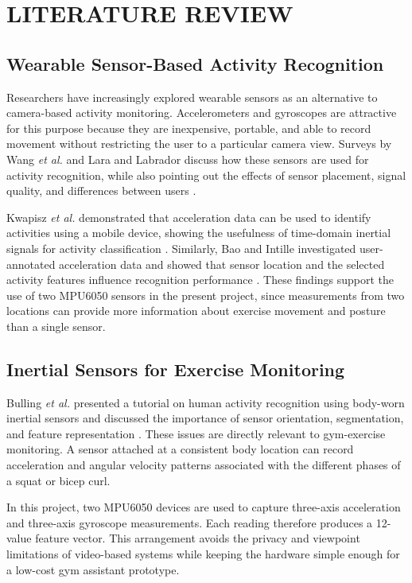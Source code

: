\chapter{LITERATURE REVIEW}

\section{Wearable Sensor-Based Activity Recognition}
Researchers have increasingly explored wearable sensors as an alternative to
camera-based activity monitoring. Accelerometers and gyroscopes are attractive for
this purpose because they are inexpensive, portable, and able to record movement
without restricting the user to a particular camera view. Surveys by Wang
\textit{et al.} and Lara and Labrador discuss how these sensors are used for activity
recognition, while also pointing out the effects of sensor placement, signal quality,
and differences between users
\cite{wang2019wearable,lara2013survey}.

Kwapisz \textit{et al.} demonstrated that acceleration data can be used to identify
activities using a mobile device, showing the usefulness of time-domain inertial
signals for activity classification \cite{kwapisz2011activity}. Similarly, Bao and
Intille investigated user-annotated acceleration data and showed that sensor
location and the selected activity features influence recognition performance
\cite{bao2004activity}. These findings support the use of two MPU6050 sensors in the
present project, since measurements from two locations can provide more information
about exercise movement and posture than a single sensor.

\section{Inertial Sensors for Exercise Monitoring}
Bulling \textit{et al.} presented a tutorial on human activity recognition using
body-worn inertial sensors and discussed the importance of sensor orientation,
segmentation, and feature representation \cite{bulling2014tutorial}. These issues
are directly relevant to gym-exercise monitoring. A sensor attached at a consistent
body location can record acceleration and angular velocity patterns associated with
the different phases of a squat or bicep curl.

In this project, two MPU6050 devices are used to capture three-axis acceleration and
three-axis gyroscope measurements. Each reading therefore produces a 12-value
feature vector. This arrangement avoids the privacy and viewpoint limitations of
video-based systems while keeping the hardware simple enough for a low-cost gym
assistant prototype.

